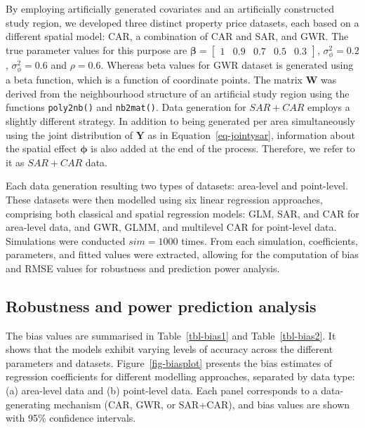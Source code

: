\documentclass[
  default,
]{sn-jnl}
\begin{document}
\endgroup{}

By employing artificially generated covariates and an artificially
constructed study region, we developed three distinct property price
datasets, each based on a different spatial model: CAR, a combination of
CAR and SAR, and GWR. The true parameter values for this purpose are
\(\boldsymbol{\beta} = \begin{bmatrix} 1 & 0.9 & 0.7 & 0.5 & 0.3 \end{bmatrix}\),
\(\sigma_{\phi}^2 = 0.2\), \(\sigma_{\phi}^2 = 0.6\) and \(\rho = 0.6\).
Whereas beta values for GWR dataset is generated using a beta function,
which is a function of coordinate points. The matrix \(\mathbf{W}\) was
derived from the neighbourhood structure of an artificial study region
using the functions \texttt{poly2nb()} and \texttt{nb2mat()}. Data
generation for \(SAR + CAR\) employs a slightly different strategy. In
addition to being generated per area simultaneously using the joint
distribution of \(\mathbf{Y}\) as in Equation~\ref{eq-jointysar},
information about the spatial effect \(\boldsymbol{\phi}\) is also added
at the end of the process. Therefore, we refer to it as \(SAR + CAR\)
data.

Each data generation resulting two types of datasets: area-level and
point-level. These datasets were then modelled using six linear
regression approaches, comprising both classical and spatial regression
models: GLM, SAR, and CAR for area-level data, and GWR, GLMM, and
multilevel CAR for point-level data. Simulations were conducted
\(sim = 1000\) times. From each simulation, coefficients, parameters,
and fitted values were extracted, allowing for the computation of bias
and RMSE values for robustness and prediction power analysis.

\subsection{Robustness and power prediction
analysis}\label{robustness-and-power-prediction-analysis}

The bias values are summarised in Table~\ref{tbl-bias1} and
Table~\ref{tbl-bias2}. It shows that the models exhibit varying levels
of accuracy across the different parameters and datasets.
Figure~\ref{fig-biasplot} presents the bias estimates of regression
coefficients for different modelling approaches, separated by data type:
(a) area-level data and (b) point-level data. Each panel corresponds to
a data-generating mechanism (CAR, GWR, or SAR+CAR), and bias values are
shown with 95\% confidence intervals.
\end{document}
